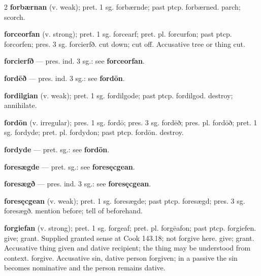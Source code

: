 \begin{multicols*}{2}
\textbf{forbærnan} (v. weak); pret. 1 sg. forbærnde; past ptcp. forbærned. parch; scorch.\par
\textbf{forceorfan} (v. strong); pret. 1 sg. forcearf; pret. pl. forcurfon; past ptcp. forcorfen; pres. 3 sg. forcierfð. cut down; cut off. Accusative tree or thing cut.\par
\textbf{forcierfð} — pres. ind. 3 sg.: see \textbf{forceorfan}.\par
\textbf{fordēð} — pres. ind. 3 sg.: see \textbf{fordōn}.\par
\textbf{fordilgian} (v. weak); pret. 1 sg. fordilgode; past ptcp. fordilgod. destroy; annihilate.\par
\textbf{fordōn} (v. irregular); pres. 1 sg. fordō; pres. 3 sg. fordēð; pres. pl. fordōð; pret. 1 sg. fordyde; pret. pl. fordydon; past ptcp. fordōn. destroy.\par
\textbf{fordyde} — pret. sg.: see \textbf{fordōn}.\par
\textbf{foresægde} — pret. sg.: see \textbf{foresęcgean}.\par
\textbf{foresægð} — pres. ind. 3 sg.: see \textbf{foresęcgean}.\par
\textbf{foresęcgean} (v. weak); pret. 1 sg. foresægde; past ptcp. foresægd; pres. 3 sg. foresægð. mention before; tell of beforehand.\par
\textbf{forgiefan} (v. strong); pret. 1 sg. forgeaf; pret. pl. forgēafon; past ptcp. forgiefen. give; grant. Supplied granted sense at Cook 143.18; not forgive here. give; grant. Accusative thing given and dative recipient; the thing may be understood from context. forgive. Accusative sin, dative person forgiven; in a passive the sin becomes nominative and the person remains dative.\par

\end{multicols*}
